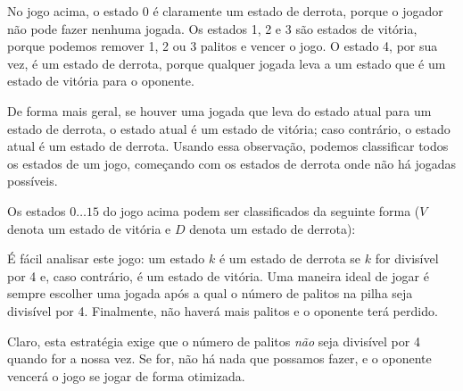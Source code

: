 No jogo acima, o estado 0 é claramente um estado de derrota, porque o jogador não pode fazer nenhuma jogada. Os estados 1, 2 e 3 são estados de vitória, porque podemos remover 1, 2 ou 3 palitos e vencer o jogo. O estado 4, por sua vez, é um estado de derrota, porque qualquer jogada leva a um estado que é um estado de vitória para o oponente.

De forma mais geral, se houver uma jogada que leva do estado atual para um estado de derrota, o estado atual é um estado de vitória; caso contrário, o estado atual é um estado de derrota. Usando essa observação, podemos classificar todos os estados de um jogo, começando com os estados de derrota onde não há jogadas possíveis.

Os estados $0 \ldots 15$ do jogo acima podem ser classificados da seguinte forma ($V$ denota um estado de vitória e $D$ denota um estado de derrota):

\begin{center}
\end{center}

É fácil analisar este jogo: um estado $k$ é um estado de derrota se $k$ for divisível por 4 e, caso contrário, é um estado de vitória. Uma maneira ideal de jogar é sempre escolher uma jogada após a qual o número de palitos na pilha seja divisível por 4. Finalmente, não haverá mais palitos e o oponente terá perdido.

Claro, esta estratégia exige que o número de palitos \emph{não} seja divisível por 4 quando for a nossa vez. Se for, não há nada que possamos fazer, e o oponente vencerá o jogo se jogar de forma otimizada.

